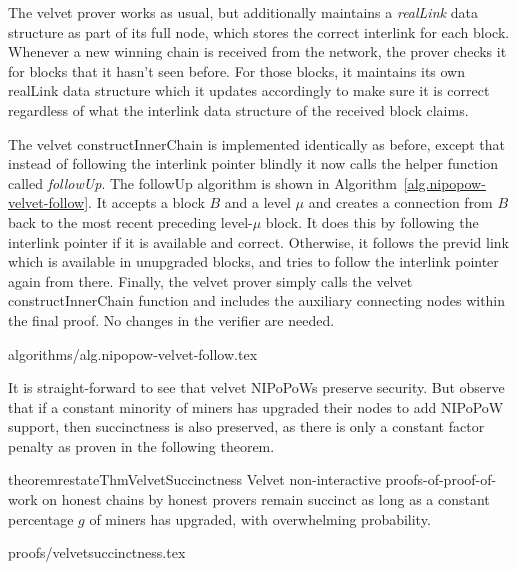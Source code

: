 The velvet prover works as usual, but additionally maintains a
\textit{realLink} data structure as part of its full node, which stores the
correct interlink for each block.  Whenever a new winning chain is received
from the network, the prover checks it for blocks that it hasn't seen before.
For those blocks, it maintains its own realLink data structure which it updates
accordingly to make sure it is correct regardless of what the interlink data
structure of the received block claims.

The velvet constructInnerChain %
is implemented identically as
before, except that instead of following the interlink pointer blindly it now
calls the helper function called \textit{followUp}. The followUp algorithm is
shown in Algorithm~\ref{alg.nipopow-velvet-follow}. It
accepts a block $B$ and a level $\mu$ and creates a connection from $B$ back to
the most recent preceding level-$\mu$ block. It does this by following the
interlink pointer if it is available and correct. Otherwise, it follows the
previd link which is available in unupgraded blocks, and tries to follow the
interlink pointer again from there. Finally, the velvet prover %
simply calls the velvet
constructInnerChain %
function and includes the auxiliary connecting nodes
within the final proof. No changes in the verifier are needed.

{algorithms/alg.nipopow-velvet-follow.tex}

It is straight-forward to see that velvet NIPoPoWs preserve security. But
observe that if a constant minority of miners has upgraded their nodes to add
NIPoPoW support, then succinctness is also preserved, as there is only a
constant factor penalty as proven in the following theorem.

\begin{restatable}{theorem}{restateThmVelvetSuccinctness}
    Velvet non-interactive proofs-of-proof-of-work on honest chains by honest
    provers remain succinct as long as a constant percentage $g$ of miners has
    upgraded, with overwhelming probability.
\end{restatable}

\ifonecolumn
{proofs/velvetsuccinctness.tex}
\fi

